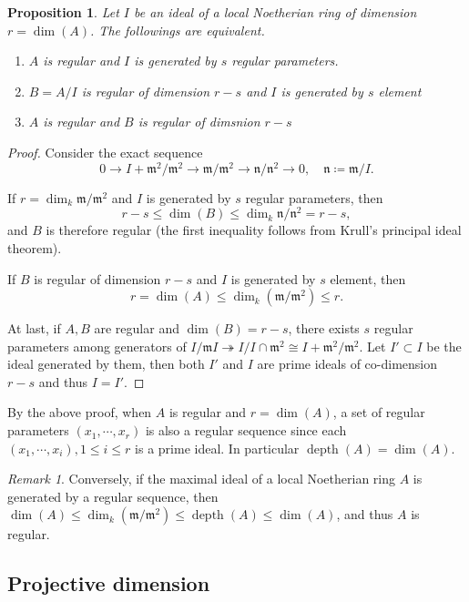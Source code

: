 \documentclass[leqno]{amsart}
\DeclareMathOperator{\depth}{depth}
\newcommand{\1}{\mathbf{1}}
\newcommand{\fm}{\mathfrak m}
\newcommand{\fn}{\mathfrak n}
\newtheorem{prop}[thm]{Proposition}
\theoremstyle{definition}
\theoremstyle{remark}
\newtheorem{rem}[thm]{Remark}
\begin{document}
\begin{prop}\label{prop:regular}
	Let  $I$ be an ideal of a local Noetherian ring 
	of dimension  $r=\dim(A)$.
	The followings are equivalent.
\begin{enumerate}[label=(\alph*)]
	\item 
	$A$ is regular and 
	$I$ is generated by $s$ regular parameters.
	\item  
	$B=A/I$ is regular of dimension  $r-s$
	and $I$ is generated by  $s$ element
	\item  
	$A$ is regular and  $B$ is regular of dimsnion  $r-s$
\end{enumerate}
\end{prop}
\begin{proof}
	Consider the exact sequence
	\[
		0\to I+\fm^2/\fm^2\to \fm/\fm^2\to \fn/\fn^2\to 0,\quad
		\fn\coloneqq \fm/I.
	\]
	
	If  $r=\dim_k\fm/\fm^2$ and 
	$I$ is generated by $s$ regular parameters, then
	\[
		r-s\leq \dim(B)\leq \dim_k \fn/\fn^2=r-s,
	\]
	and $B$ is therefore regular
	(the first inequality follows from Krull's principal
	ideal theorem).

	If $B$ is regular of dimension  $r-s$
	and $I$ is generated by  $s$ element, then
	\[
		r=\dim(A)\leq \dim_k(\fm/\fm^2)\leq r.
	\]

	At last, if $A, B$ are regular and $\dim(B)=r-s$,
	there exists $s$ regular parameters among generators of
	$I/\fm I\twoheadrightarrow I/I\cap \fm^2\cong I+\fm^2/\fm^2$.
	Let $I'\subset I$ be the ideal generated by them,
	then both $I'$ and  $I$ are prime ideals 
	of co-dimension  $r-s$ and thus  $I=I'$.
\end{proof}
By the above proof, when $A$ is regular and  $r=\dim(A)$,
a set of regular parameters  $(x_1,\cdots,x_r)$
is also a regular sequence since each 
$(x_1,\cdots,x_i), 1\leq i\leq r$ is a prime ideal.
In particular $\depth(A)=\dim(A)$.
\begin{rem}
Conversely, if the maximal ideal of a local Noetherian ring $A$	
is generated by a regular sequence, then
$\dim(A)\leq \dim_k(\fm/\fm^2)\leq \depth(A)\leq \dim(A)$,
and thus  $A$ is regular.
\end{rem}



\subsection{Projective dimension}
\end{document}

